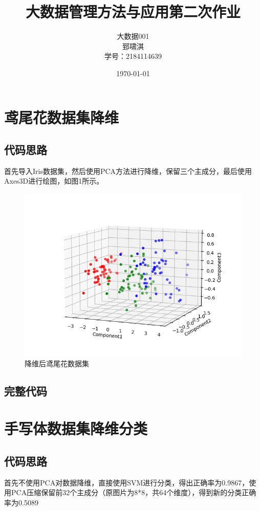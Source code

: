 \documentclass[12pt, a4paper, oneside, fontset=windows]{ctexart}
\title{\textbf{大数据管理方法与应用第二次作业}}
\author{大数据001\\郅啸淇\\学号：2184114639}
\date{\today}
\begin{document}
\maketitle
\newpage
\newpage
\section{鸢尾花数据集降维}
\subsection{代码思路}
首先导入Iris数据集，然后使用PCA方法进行降维，保留三个主成分，最后使用Axes3D进行绘图，如图1所示。

\begin{figure}[h]
    \centering
    \includegraphics[scale = 0.8]{3D_Iris.png}
    \caption{降维后鸢尾花数据集}
\end{figure}
\subsection{完整代码}


\section{手写体数据集降维分类}
\subsection{代码思路}
首先不使用PCA对数据降维，直接使用SVM进行分类，得出正确率为0.9867，使用PCA压缩保留前32个主成分（原图片为8*8，共64个维度），得到新的分类正确率为0.5089
\end{document}
